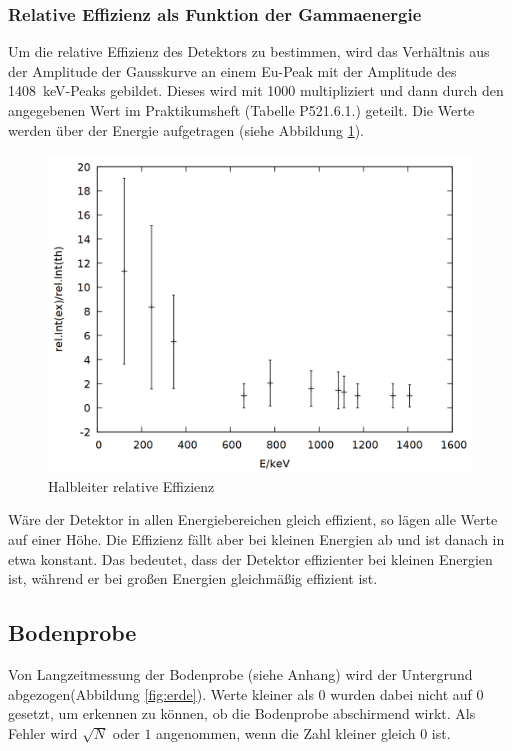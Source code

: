 \subsubsection*{Relative Effizienz als Funktion der Gammaenergie}
Um die relative Effizienz des Detektors zu bestimmen, wird das Verhältnis aus der Amplitude der Gausskurve an einem Eu-Peak mit der Amplitude des \SI{1408}{keV}-Peaks gebildet. Dieses wird mit 1000 multipliziert und dann durch den angegebenen Wert im Praktikumsheft \cite{praktikumsheft}(Tabelle P521.6.1.) geteilt. Die Werte werden über der Energie aufgetragen (siehe Abbildung \ref{fig:ge_relint}).

\begin{figure}
\centering
\includegraphics[width=0.7\linewidth]{data/ge_relint.png}
\caption{Halbleiter relative Effizienz}
\label{fig:ge_relint}
\end{figure}

Wäre der Detektor in allen Energiebereichen gleich effizient, so lägen alle Werte auf einer Höhe. Die Effizienz fällt aber bei kleinen Energien ab und ist danach in etwa konstant. Das bedeutet, dass der Detektor effizienter bei kleinen Energien ist, während er bei großen Energien gleichmäßig effizient ist.

\subsection{Bodenprobe}
Von Langzeitmessung der Bodenprobe (siehe Anhang) wird der Untergrund abgezogen(Abbildung \ref{fig:erde}). Werte kleiner als 0 wurden dabei nicht auf 0 gesetzt, um erkennen zu können, ob die Bodenprobe abschirmend wirkt. Als Fehler wird $\sqrt{N}$ oder $1$ angenommen, wenn die Zahl kleiner gleich 0 ist.

